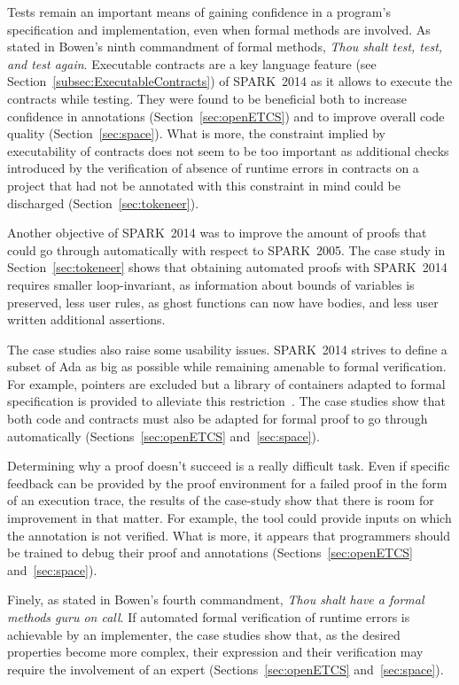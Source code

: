 \documentclass[10pt,a4paper,twocolumn]{article}
\newcommand{\oldspark}{SPARK~2005\xspace}
\newcommand{\newspark}{SPARK~2014\xspace}
\begin{document}
Tests remain an important means of gaining confidence in a program's
specification and implementation, even when formal methods are involved. As
stated in Bowen's ninth commandment of formal methods, \emph{Thou shalt test,
test, and test again}. Executable contracts are a key language
feature (see Section~\ref{subsec:ExecutableContracts}) of \newspark as it allows to execute
the contracts while testing. They were found to be beneficial both to increase
confidence in annotations (Section~\ref{sec:openETCS}) and to improve overall
code quality (Section~\ref{sec:space}). What is more, the constraint implied by
executability of contracts does not seem to be too important as additional
checks introduced by the verification of absence of runtime errors in contracts
on a project that had not be annotated with this constraint in mind could be
discharged (Section~\ref{sec:tokeneer}).

Another objective of \newspark was to improve the amount of proofs that could
go through automatically with respect to \oldspark. The case study in
Section~\ref{sec:tokeneer} shows that obtaining automated proofs with \newspark
requires smaller loop-invariant, as information about bounds of variables is
preserved, less user rules, as ghost functions can now have bodies, and less
user written additional assertions.

The case studies also raise some usability issues.
\newspark strives to define a subset of Ada as big as possible while remaining
amenable to formal verification. For example, pointers are excluded but a
library of containers adapted to formal specification is provided to alleviate
this restriction~\cite{dross2011correct}. The case studies show that both code
and contracts must also be adapted for formal proof to go through automatically
(Sections~\ref{sec:openETCS} and~\ref{sec:space}).

Determining why a proof doesn't succeed is a really difficult task. Even if
specific feedback can be provided by the proof environment for a failed proof
in the form of an execution trace, the results of the case-study show
that there is room for improvement in that matter. For example, the
tool could provide inputs on which the annotation is not verified.
What is more, it appears that programmers should be trained to debug their proof
and annotations (Sections~\ref{sec:openETCS} and~\ref{sec:space}).

Finely, as stated in Bowen's fourth commandment, \emph{Thou shalt have a formal
methods guru on call}. If automated formal verification of runtime errors is
achievable by an implementer, the case studies show that, as the desired
properties become more complex, their expression and their verification may
require the involvement of an expert (Sections~\ref{sec:openETCS}
and~\ref{sec:space}).
\end{document}
